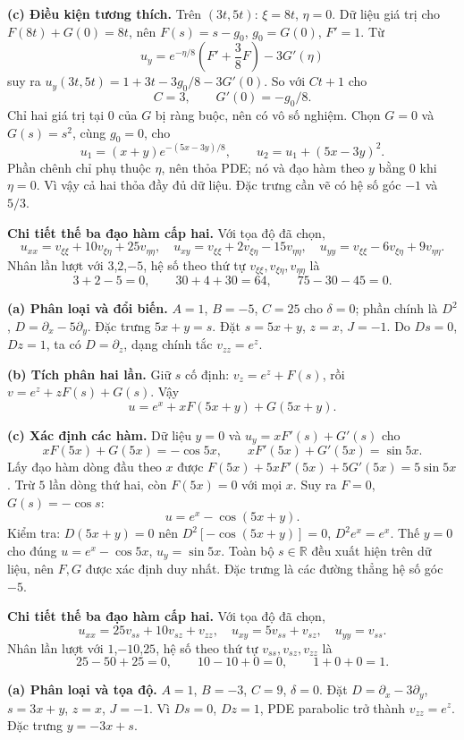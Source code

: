 \textbf{(c) Điều kiện tương thích.} Trên $(3t,5t)$: $\xi=8t$, $\eta=0$. Dữ liệu giá trị cho $F(8t)+G(0)=8t$, nên $F(s)=s-g_0$, $g_0=G(0)$, $F'=1$. Từ
\[u_y=e^{-\eta/8}\left(F'+\frac38F\right)-3G'(\eta)\]
suy ra $u_y(3t,5t)=1+3t-3g_0/8-3G'(0)$. So với $Ct+1$ cho
\[\boxed{C=3,\qquad G'(0)=-g_0/8.}\]
Chỉ hai giá trị tại $0$ của $G$ bị ràng buộc, nên có vô số nghiệm. Chọn $G=0$ và $G(s)=s^2$, cùng $g_0=0$, cho
\[u_1=(x+y)e^{-(5x-3y)/8},\qquad u_2=u_1+(5x-3y)^2.\]
Phần chênh chỉ phụ thuộc $\eta$, nên thỏa PDE; nó và đạo hàm theo $y$ bằng $0$ khi $\eta=0$. Vì vậy cả hai thỏa đầy đủ dữ liệu. Đặc trưng cần vẽ có hệ số góc $-1$ và $5/3$.

\textbf{Chi tiết thế ba đạo hàm cấp hai.} Với tọa độ đã chọn,
\[u_{xx}=v_{\xi\xi}+10v_{\xi\eta}+25v_{\eta\eta},\quad u_{xy}=v_{\xi\xi}+2v_{\xi\eta}-15v_{\eta\eta},\quad u_{yy}=v_{\xi\xi}-6v_{\xi\eta}+9v_{\eta\eta}.\]
Nhân lần lượt với $3$,$2$,$-5$, hệ số theo thứ tự $v_{\xi\xi},v_{\xi\eta},v_{\eta\eta}$ là
\[3+2-5=0,\qquad 30+4+30=64,\qquad 75-30-45=0.\]

\textbf{(a) Phân loại và đổi biến.} $A=1$, $B=-5$, $C=25$ cho $\delta=0$; phần chính là $D^2$, $D=\partial_x-5\partial_y$. Đặc trưng $5x+y=s$. Đặt $s=5x+y$, $z=x$, $J=-1$. Do $Ds=0$, $Dz=1$, ta có $D=\partial_z$, dạng chính tắc $v_{zz}=e^z$.

\textbf{(b) Tích phân hai lần.} Giữ $s$ cố định: $v_z=e^z+F(s)$, rồi $v=e^z+zF(s)+G(s)$. Vậy
\[u=e^x+xF(5x+y)+G(5x+y).\]

\textbf{(c) Xác định các hàm.} Dữ liệu $y=0$ và $u_y=xF'(s)+G'(s)$ cho
\[xF(5x)+G(5x)=-\cos5x,\qquad xF'(5x)+G'(5x)=\sin5x.\]
Lấy đạo hàm dòng đầu theo $x$ được $F(5x)+5xF'(5x)+5G'(5x)=5\sin5x$. Trừ $5$ lần dòng thứ hai, còn $F(5x)=0$ với mọi $x$. Suy ra $F=0$, $G(s)=-\cos s$:
\[\boxed{u=e^x-\cos(5x+y).}\]
Kiểm tra: $D(5x+y)=0$ nên $D^2[-\cos(5x+y)]=0$, $D^2e^x=e^x$. Thế $y=0$ cho đúng $u=e^x-\cos5x$, $u_y=\sin5x$. Toàn bộ $s\in\mathbb R$ đều xuất hiện trên dữ liệu, nên $F,G$ được xác định duy nhất. Đặc trưng là các đường thẳng hệ số góc $-5$.

\textbf{Chi tiết thế ba đạo hàm cấp hai.} Với tọa độ đã chọn,
\[u_{xx}=25v_{ss}+10v_{sz}+v_{zz},\quad u_{xy}=5v_{ss}+v_{sz},\quad u_{yy}=v_{ss}.\]
Nhân lần lượt với $1$,$-10$,$25$, hệ số theo thứ tự $v_{ss},v_{sz},v_{zz}$ là
\[25-50+25=0,\qquad 10-10+0=0,\qquad 1+0+0=1.\]

\textbf{(a) Phân loại và tọa độ.} $A=1$, $B=-3$, $C=9$, $\delta=0$. Đặt $D=\partial_x-3\partial_y$, $s=3x+y$, $z=x$, $J=-1$. Vì $Ds=0$, $Dz=1$, PDE parabolic trở thành $v_{zz}=e^z$. Đặc trưng $y=-3x+s$.

